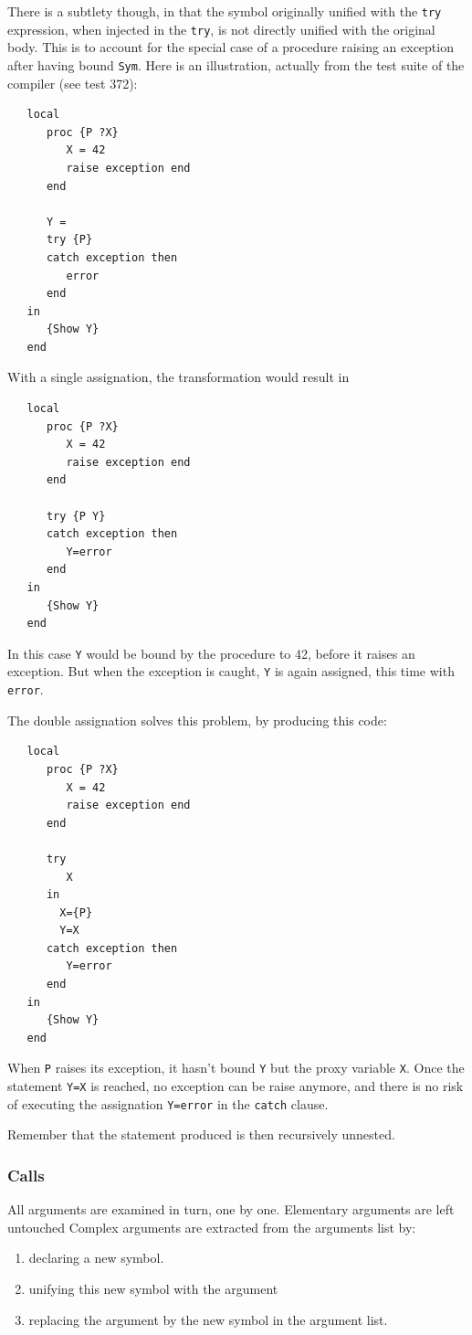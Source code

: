 \documentclass[a4paper]{memoir}
\begin{document}
There is a subtlety though, in that the symbol originally unified with the \lstinline!try!
expression, when injected in the \lstinline!try!, is not directly unified with
the original body. This is to account for the special case of a procedure
raising an exception after having bound \lstinline!Sym!. Here is an
illustration, actually from the test suite of the compiler (see test 372):
\begin{lstlisting}
   local
      proc {P ?X}
         X = 42
         raise exception end
      end
   
      Y =
      try {P}
      catch exception then
         error
      end
   in
      {Show Y}
   end
\end{lstlisting}
With a single assignation, the transformation would result in 
\begin{lstlisting}
   local
      proc {P ?X}
         X = 42
         raise exception end
      end
   
      try {P Y}
      catch exception then
         Y=error
      end
   in
      {Show Y}
   end
\end{lstlisting}


In this case \lstinline!Y! would be bound by
the procedure to 42, before it raises an exception. 
But when the exception is caught, \lstinline!Y! is again
assigned, this time with \lstinline!error!.

The double assignation solves this problem, by producing this code:
\begin{lstlisting}
   local
      proc {P ?X}
         X = 42
         raise exception end
      end
   
      try 
         X
      in 
        X={P}
        Y=X
      catch exception then
         Y=error
      end
   in
      {Show Y}
   end
\end{lstlisting}

When \lstinline!P! raises its exception, it hasn't bound \lstinline!Y! but the
proxy variable \lstinline!X!. Once the statement \lstinline!Y=X! is reached, no
exception can be raise anymore, and there is no risk of executing the
assignation \lstinline!Y=error! in the \lstinline!catch! clause.


Remember that the statement produced is then recursively unnested.




\subsubsection{Calls}\label{sec:arch:unnester:calls}
All arguments are examined in turn, one by one. Elementary arguments are left untouched
Complex arguments are extracted from the arguments list by:
\begin{enumerate}
  \item declaring a new symbol. 
  \item unifying this new symbol with the argument
  \item replacing the argument by the new symbol in the argument list.
\end{enumerate}
\end{document}
